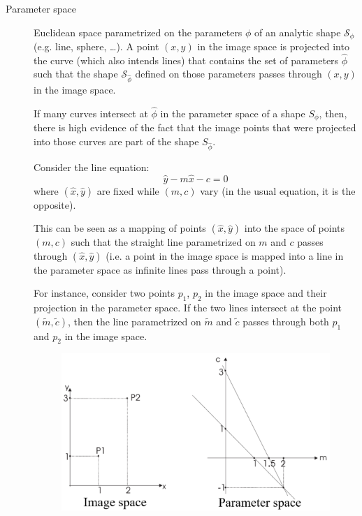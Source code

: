 \begin{description}
    \item[Parameter space] 
        Euclidean space parametrized on the parameters $\phi$ of an analytic shape $\mathcal{S}_\phi$ (e.g. line, sphere, \dots).
        A point $(x, y)$ in the image space is projected into the curve (which also intends lines) that contains the set of parameters $\hat{\phi}$
        such that the shape $\mathcal{S}_{\hat{\phi}}$ defined on those parameters passes through $(x, y)$ in the image space.

        \begin{remark}
            If many curves intersect at $\hat{\phi}$ in the parameter space of a shape $S_\phi$, then, there is high evidence of the fact that 
            the image points that were projected into those curves are part of the shape $S_{\hat{\phi}}$.
        \end{remark}

        \begin{example} 
            Consider the line equation:
            \[ \hat{y} - m\hat{x} - c = 0 \]
            where $(\hat{x}, \hat{y})$ are fixed while $(m, c)$ vary (in the usual equation, it is the opposite).

            This can be seen as a mapping of points $(\hat{x}, \hat{y})$ into the space
            of points $(m, c)$ such that the straight line parametrized on $m$ and $c$ passes through $(\hat{x}, \hat{y})$
            (i.e. a point in the image space is mapped into a line in the parameter space as infinite lines pass through a point).

            For instance, consider two points $p_1$, $p_2$ in the image space and
            their projection in the parameter space.
            If the two lines intersect at the point $(\tilde{m}, \tilde{c})$,
            then the line parametrized on $\tilde{m}$ and $\tilde{c}$ passes through both $p_1$ and $p_2$ in the image space.
            
            \begin{figure}[H]
                \centering
                \includegraphics[width=0.4\linewidth]{./img/hough_line_parameter_space.png}
            \end{figure}


\end{example}
\end{description}
